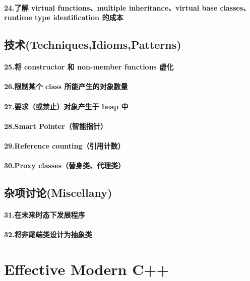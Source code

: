 \documentclass[UTF8,a4paper,12pt]{ctexbook}
\begin{document}
			\paragraph{24.了解 virtual functions、multiple inheritance、virtual base classes、runtime type identification 的成本 }
			
		\subsection{技术(Techniques,Idioms,Patterns)}
			\paragraph{25.将 constructor 和 non-member functions 虚化}
			\paragraph{26.限制某个 class 所能产生的对象数量}
			\paragraph{27.要求（或禁止）对象产生于 heap 中}
			\paragraph{28.Smart Pointer（智能指针）}
			\paragraph{29.Reference counting（引用计数）}
			\paragraph{30.Proxy classes（替身类、代理类）}
			
		\subsection{杂项讨论(Miscellany)}
			\paragraph{31.在未来时态下发展程序}
			\paragraph{32.将非尾端类设计为抽象类}	
				
	\section{Effective Modern C++}
\end{document}
